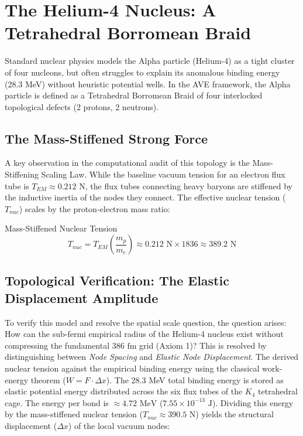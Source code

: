 \section{The Helium-4 Nucleus: A Tetrahedral Borromean Braid}

Standard nuclear physics models the Alpha particle (Helium-4) as a tight cluster of four nucleons, but often struggles to explain its anomalous binding energy (28.3 MeV) without heuristic potential wells. In the AVE framework, the Alpha particle is defined as a Tetrahedral Borromean Braid of four interlocked topological defects (2 protons, 2 neutrons).

\subsection{The Mass-Stiffened Strong Force}

A key observation in the computational audit of this topology is the Mass-Stiffening Scaling Law. While the baseline vacuum tension for an electron flux tube is $T_{EM}\approx0.212\text{ N}$, the flux tubes connecting heavy baryons are stiffened by the inductive inertia of the nodes they connect. The effective nuclear tension ($T_{nuc}$) scales by the proton-electron mass ratio:

\begin{resultbox}{Mass-Stiffened Nuclear Tension}
\begin{equation}
    T_{nuc} = T_{EM}\left(\frac{m_p}{m_e}\right) \approx 0.212\text{ N} \times 1836 \approx 389.2\text{ N}
\end{equation}
\end{resultbox}

\subsection{Topological Verification: The Elastic Displacement Amplitude}

To verify this model and resolve the spatial scale question, the question arises: How can the sub-fermi empirical radius of the Helium-4 nucleus exist without compressing the fundamental $386\text{ fm}$ grid (Axiom 1)? This is resolved by distinguishing between \textit{Node Spacing} and \textit{Elastic Node Displacement}. The derived nuclear tension against the empirical binding energy using the classical work-energy theorem ($W = F \cdot \Delta x$). The 28.3 MeV total binding energy is stored as elastic potential energy distributed across the six flux tubes of the $K_{4}$ tetrahedral cage. The energy per bond is $\approx 4.72\text{ MeV}$ ($7.55 \times 10^{-13}\text{ J}$). Dividing this energy by the mass-stiffened nuclear tension ($T_{nuc} \approx 390.5\text{ N}$) yields the structural displacement ($\Delta x$) of the local vacuum nodes:

